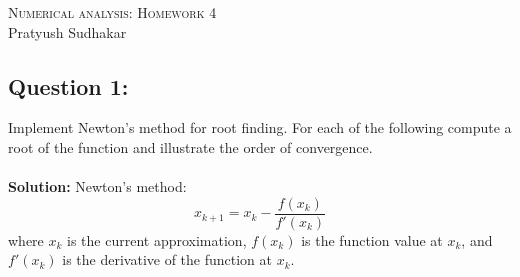 \documentclass[11pt,onecolumn]{article}
\begin{document}
\noindent
\textsc{\Large Numerical analysis: Homework 4}\\
Pratyush Sudhakar\\

\subsection*{Question 1:}
Implement Newton's method for root finding. For each of the following compute a root of the function and illustrate the order of convergence.
\\
\vspace{0pt}
\\
\textbf{Solution:} 
Newton's method:
\[
x_{k+1} = x_k - \frac{f(x_k)}{f'(x_k)}
\]
where \( x_k \) is the current approximation, \( f(x_k) \) is the function value at \( x_k \), and \( f'(x_k) \) is the derivative of the function at \( x_k \).
\end{document}
